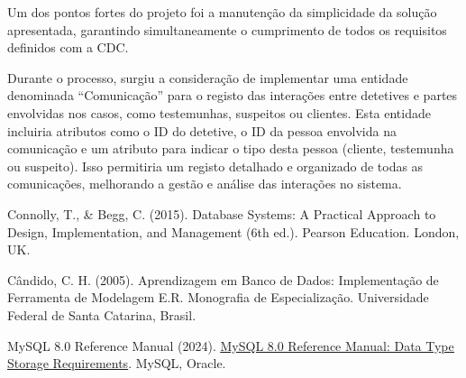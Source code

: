 \documentclass[a4paper,12pt]{scrreprt}
\begin{document}
    Um dos pontos fortes do projeto foi a manutenção da simplicidade da solução apresentada, garantindo simultaneamente o cumprimento de todos os requisitos definidos com a CDC.

    Durante o processo, surgiu a consideração de implementar uma entidade denominada “Comunicação” para o registo das interações entre detetives e partes envolvidas nos casos, como testemunhas, suspeitos ou clientes. Esta entidade incluiria atributos como o ID do detetive, o ID da pessoa envolvida na comunicação e um atributo para indicar o tipo desta pessoa (cliente, testemunha ou suspeito). Isso permitiria um registo detalhado e organizado de todas as comunicações, melhorando a gestão e análise das interações no sistema.




\begin{thebibliography}{9}
Connolly, T., \& Begg, C. (2015). Database Systems: A Practical Approach to Design, Implementation, and Management (6th ed.). Pearson Education. London, UK.

Cândido, C. H. (2005). Aprendizagem em Banco de Dados: Implementação de Ferramenta de Modelagem E.R. Monografia de Especialização. Universidade Federal de Santa Catarina, Brasil.

MySQL 8.0 Reference Manual (2024). \href{https://dev.mysql.com/doc/refman/8.0/en/storage-requirements.html}{\underline{MySQL 8.0 Reference Manual: Data Type Storage} \underline{Requirements}}. MySQL, Oracle.

\end{thebibliography}


\end{document}
